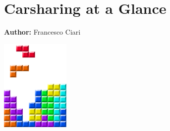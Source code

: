 \chapter{Carsharing at a Glance }
\label{ch:carsharing}

\hfill \textbf{Author:} Francesco Ciari

\begin{center} \includegraphics[width=0.25\textwidth, angle=0]{figures/MATSimBook.png} \end{center}


\citet[][]{CiariEtAl_TechRep_IVT_2013, CiariEtAl_TechRep_IVT_2014, CiariEtAl_TRB_2009}

